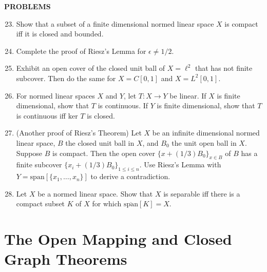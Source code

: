 \begin{center}
	\textbf{PROBLEMS}
\end{center}
\begin{enumerate}
	\setcounter{enumi}{22}
    \item Show that a subset of a finite dimensional normed linear space $X$ is compact iff it is closed and bounded.
    \item Complete the proof of Riesz's Lemma for $\epsilon\neq1/2$.
    \item Exhibit an open cover of the closed unit ball of $X=\ell^2$ that has not finite subcover.
    Then do the same for $X=C[0,1]$ and $X=L^2[0,1]$.
    \item For normed linear spaces $X$ and $Y$, let $T:X\to Y$ be linear.
    If $X$ is finite dimensional, show that $T$ is continuous. 
    If $Y$ is finite dimensional, show that $T$ is continuous iff $\text{ker }T$ is closed.
    \item (Another proof of Riesz's Theorem) Let $X$ be an infinite dimensional normed linear space, $B$ the closed unit ball in $X$, and $B_0$ the unit open ball in $X$.
    Suppose $B$ is compact.
    Then the open cover $\{x+(1/3)B_0\}_{x\in B}$ of $B$ has a finite subcover $\{x_i+(1/3)B_0\}_{1\le i\le n}$.
    Use Riesz's Lemma with $Y=\text{span}[\{x_1,\dots,x_n\}]$ to derive a contradiction.
    \item Let $X$ be a normed linear space.
    Show that $X$ is separable iff there is a compact subset $K$ of $X$ for which $\overline{\text{span}}[K]=X$.
\end{enumerate}

\section{The Open Mapping and Closed Graph Theorems}\

